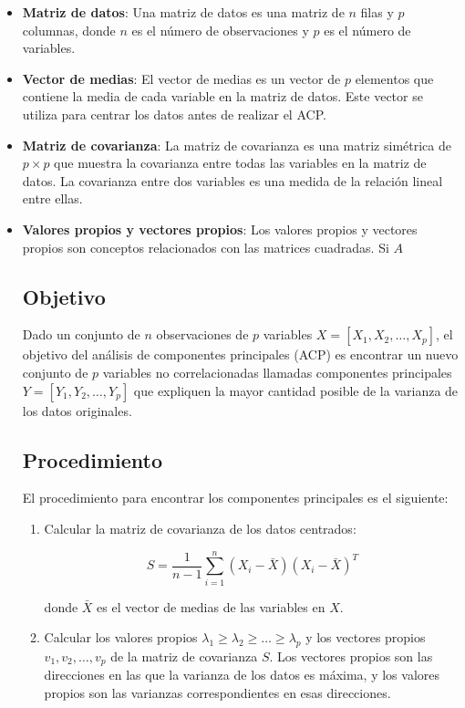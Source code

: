 \documentclass{article}
\begin{document}
\begin{itemize}
\item \textbf{Matriz de datos}: Una matriz de datos es una matriz de $n$ filas y $p$ columnas, donde $n$ es el número de observaciones y $p$ es el número de variables.


\item \textbf{Vector de medias}: El vector de medias es un vector de $p$ elementos que contiene la media de cada variable en la matriz de datos. Este vector se utiliza para centrar los datos antes de realizar el ACP.

\item \textbf{Matriz de covarianza}: La matriz de covarianza es una matriz simétrica de $p \times p$ que muestra la covarianza entre todas las variables en la matriz de datos. La covarianza entre dos variables es una medida de la relación lineal entre ellas.

\item \textbf{Valores propios y vectores propios}: Los valores propios y vectores propios son conceptos relacionados con las matrices cuadradas. Si $A$

\subsection*{Objetivo}

Dado un conjunto de $n$ observaciones de $p$ variables $X = [X_1, X_2, \dots, X_p]$, el objetivo del análisis de componentes principales (ACP) es encontrar un nuevo conjunto de $p$ variables no correlacionadas llamadas componentes principales $Y = [Y_1, Y_2, \dots, Y_p]$ que expliquen la mayor cantidad posible de la varianza de los datos originales.

\subsection*{Procedimiento}

El procedimiento para encontrar los componentes principales es el siguiente:

\begin{enumerate}
\item Calcular la matriz de covarianza de los datos centrados:

$$S = \frac{1}{n-1} \sum_{i=1}^{n} (X_i - \bar{X})(X_i - \bar{X})^T$$

donde $\bar{X}$ es el vector de medias de las variables en $X$.

\item Calcular los valores propios $\lambda_1 \geq \lambda_2 \geq \dots \geq \lambda_p$ y los vectores propios $v_1, v_2, \dots, v_p$ de la matriz de covarianza $S$. Los vectores propios son las direcciones en las que la varianza de los datos es máxima, y los valores propios son las varianzas correspondientes en esas direcciones.


\end{enumerate}
\end{itemize}
\end{document}
